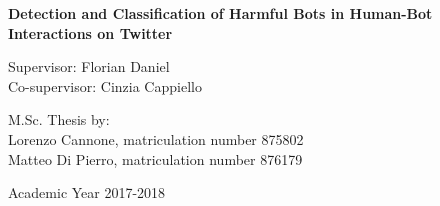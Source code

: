 {\begin{center}
\vspace{1cm} 
\LARGE
\textbf{Detection and Classification of Harmful Bots in Human-Bot Interactions on Twitter}\\


\vspace{2.0cm}

\end{center}


\vspace{2.0cm} 
\large
\begin{flushleft}
Supervisor: Florian Daniel\\
Co-supervisor: Cinzia Cappiello
\end{flushleft}

\vspace{1.0cm}

\begin{flushright}
M.Sc. Thesis by: \\ 
{Lorenzo Cannone}, matriculation number 875802 \\ 
{Matteo Di Pierro}, matriculation number 876179 \\
\end{flushright}

\vspace{1cm}

\begin{center}
Academic Year 2017-2018
\end{center} 

\clearpage
}
